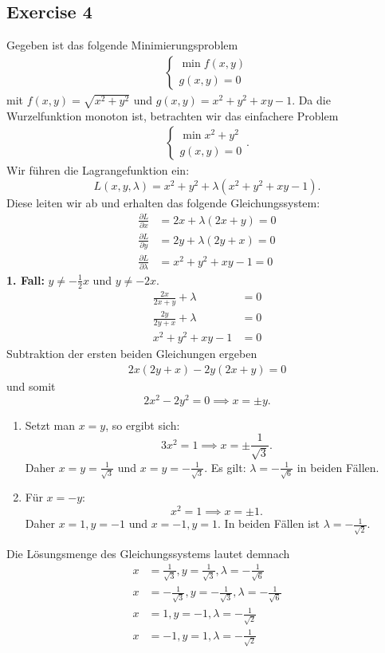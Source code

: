 \documentclass[a4paper]{article}
\begin{document}
\subsection*{Exercise 4}
Gegeben ist das folgende Minimierungsproblem
\begin{align*}
	\begin{cases}
		\min f(x,y) \\
		g(x,y) = 0
	\end{cases}
\end{align*}
mit $f(x,y) = \sqrt{x^2 + y^2}$ und $g(x,y) = x^2 + y^2 + xy - 1$. Da die Wurzelfunktion monoton ist, betrachten wir das einfachere Problem
\begin{align*}
	\begin{cases}
		\min x^2 + y^2 \\
		g(x,y) = 0
	\end{cases}.
\end{align*}
Wir führen die Lagrangefunktion ein:
\[
	L(x,y,\lambda) = x^2 + y^2 + \lambda(x^2 + y^2 +xy - 1).
\]
Diese leiten wir ab und erhalten das folgende Gleichungssystem:
\begin{align*}
	\frac{\partial L}{\partial x} &= 2x + \lambda(2x + y) = 0 \\
	\frac{\partial L}{\partial y} &= 2y + \lambda(2y + x) = 0 \\
		\frac{\partial L}{\partial \lambda} &= x^2 + y^2 +xy - 1 = 0
\end{align*}
\textbf{1. Fall:} $y \neq -\frac{1}{2}x$ und $y \neq -2x$. 
\begin{align*}
	\frac{2x}{2x + y} + \lambda &= 0 \\
	\frac{2y}{2y + x} + \lambda &= 0 \\ 
	 x^2 + y^2 +xy - 1 &= 0
\end{align*}
Subtraktion der ersten beiden Gleichungen ergeben
\begin{align*}
2x(2y + x) - 2y(2x + y)  = 0
\end{align*}
und somit 
\[
	2x^2 - 2y^2 = 0 \implies x = \pm y.
\]
\begin{enumerate}
\item Setzt man $x = y$, so ergibt sich:
\[
	3x^2 = 1 \implies x = \pm \frac{1}{\sqrt{3}}.
\]
Daher $x = y = \frac{1}{\sqrt{3}}$ und $x = y = -\frac{1}{\sqrt{3}}$. Es gilt: $\lambda = - \frac{1}{\sqrt 6}$ in beiden Fällen.

\item Für $x = -y$:
\[
	x^2 = 1 \implies x = \pm 1.
\]
Daher $x = 1, y= -1$ und $x = -1, y = 1$. In beiden Fällen ist $\lambda = -\frac{1}{\sqrt 2}$.
\end{enumerate}
Die Lösungsmenge des Gleichungssystems lautet demnach
\begin{align*}
	x &= \frac{1}{\sqrt{3}}, y = \frac{1}{\sqrt{3}}, \lambda = -\frac{1}{\sqrt 6} \\
	x &= -\frac{1}{\sqrt{3}}, y = -\frac{1}{\sqrt{3}}, \lambda = -\frac{1}{\sqrt 6} \\
	x &= 1, y = -1, \lambda = -\frac{1}{\sqrt 2} \\
	 x &= -1, y = 1, \lambda = -\frac{1}{\sqrt 2}
\end{align*}
\end{document}

